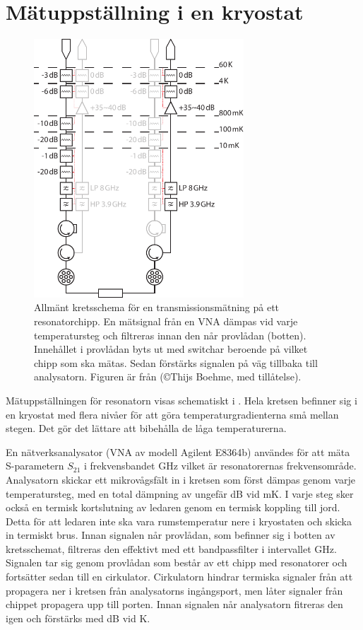 \documentclass[main.tex]{subfiles}
\begin{document}
\section{Mätuppställning i en kryostat}
\label{sec:matuppstallning}
\begin{figure}
    \centering
    \includegraphics[width=0.7\textwidth]{figure/kretsar/cryo.pdf}
    \caption{Allmänt kretsschema för en transmissionsmätning på ett resonatorchipp.
    En mätsignal från en VNA dämpas vid varje temperatursteg och filtreras innan den når provlådan (botten). Innehållet i provlådan byts ut med switchar beroende på vilket chipp som ska mätas. Sedan förstärks signalen på väg tillbaka till analysatorn. Figuren är från \cite[fig. 3.7]{Boehme2016} (\copyright Thijs Boehme, med tillåtelse).}
    \label{fig:matuppstallning}
\end{figure}

Mätuppställningen för resonatorn visas schematiskt i . Hela kretsen befinner sig i en kryostat med flera nivåer för att göra temperaturgradienterna små mellan stegen. Det gör det lättare att bibehålla de låga temperaturerna.

En nätverksanalysator (VNA av modell Agilent E8364b) användes för att mäta S-parametern $S_{21}$ i frekvensbandet \unit[4-8]{GHz} vilket är resonatorernas frekvensområde.
Analysatorn skickar ett mikrovågsfält in i kretsen som först dämpas genom varje temperatursteg, med en total dämpning av ungefär \unit[67]{dB} vid \unit[10]{mK}. I varje steg sker också en termisk kortslutning av ledaren genom en termisk koppling till jord. Detta för att ledaren inte ska vara rumstemperatur nere i kryostaten och skicka in termiskt brus. Innan signalen når provlådan, som befinner sig i botten av kretsschemat, filtreras den effektivt med ett bandpassfilter i intervallet \unit[4-8]{GHz}. Signalen tar sig genom provlådan som består av ett chipp med resonatorer och fortsätter sedan till en cirkulator. Cirkulatorn hindrar termiska signaler från att propagera ner i kretsen från analysatorns ingångsport, men låter signaler från chippet propagera upp till porten. Innan signalen når analysatorn fitreras den igen och förstärks med \unit[35-40]{dB} vid \unit[4]{K}.
\end{document}
